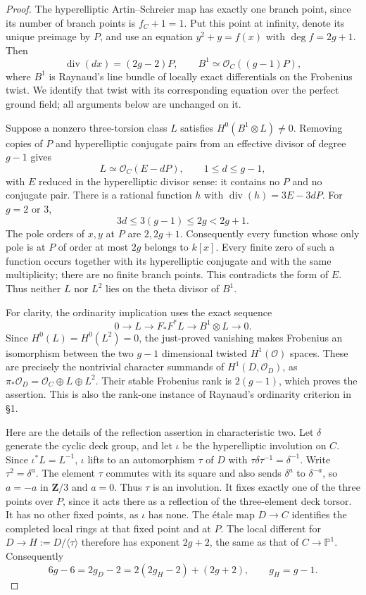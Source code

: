 \documentclass[11pt,a4paper]{article}
\newcommand{\Z}{\mathbf Z}
\begin{document}
\begin{proof}
The hyperelliptic Artin--Schreier map has exactly one
branch point, since its number of branch points is
$f_C+1=1$. Put this point at infinity, denote its
unique preimage by $P$, and use an equation
$y^2+y=f(x)$ with $\deg f=2g+1$. Then
\[
 \operatorname{div}(dx)=(2g-2)P,
 \qquad B^1\simeq\mathcal O_C((g-1)P),
\]
where $B^1$ is Raynaud's line bundle of locally exact
differentials on the Frobenius twist. We identify that
twist with its corresponding equation over the perfect
ground field; all arguments below are unchanged on it.

Suppose a nonzero three-torsion class $L$ satisfies
$H^0(B^1\otimes L)\ne0$. Removing copies of $P$ and
hyperelliptic conjugate pairs from an effective divisor
of degree $g-1$ gives
\[
 L\simeq\mathcal O_C(E-dP),\qquad 1\le d\le g-1,
\]
with $E$ reduced in the hyperelliptic divisor sense:
it contains no $P$ and no conjugate pair. There is a
rational function $h$ with
$\operatorname{div}(h)=3E-3dP$. For $g=2$ or $3$,
\[
 3d\le3(g-1)\le2g<2g+1.
\]
The pole orders of $x,y$ at $P$ are $2,2g+1$.
Consequently every function whose only pole is at
$P$ of order at most $2g$ belongs to $k[x]$.
Every finite zero of such a function occurs together
with its hyperelliptic conjugate and with the same
multiplicity; there are no finite branch points.
This contradicts the form of $E$. Thus neither $L$
nor $L^2$ lies on the theta divisor of $B^1$.

For clarity, the ordinarity implication uses the exact
sequence
\[
 0\longrightarrow L\longrightarrow F_*F^*L
   \longrightarrow B^1\otimes L\longrightarrow0.
\]
Since $H^0(L)=H^0(L^2)=0$, the just-proved vanishing
makes Frobenius an isomorphism between the two
$g-1$ dimensional twisted $H^1(\mathcal O)$ spaces.
These are precisely the nontrivial character summands
of $H^1(D,\mathcal O_D)$, as
$\pi_*\mathcal O_D=\mathcal O_C\oplus L\oplus L^2$.
Their stable Frobenius rank is $2(g-1)$, which proves
the assertion. This is also the rank-one instance of
Raynaud's ordinarity criterion in \S1.
\citep[\S1, before Proposition~1]{LA_Raynaud2000}

Here are the details of the reflection assertion in
characteristic two. Let $\delta$ generate the cyclic
deck group, and let $\iota$ be the hyperelliptic
involution on $C$. Since $\iota^*L=L^{-1}$,
$\iota$ lifts to an automorphism $\tau$ of $D$ with
$\tau\delta\tau^{-1}=\delta^{-1}$.
Write $\tau^2=\delta^a$. The element $\tau$ commutes
with its square and also sends $\delta^a$ to
$\delta^{-a}$, so $a=-a$ in $\Z/3$ and $a=0$.
Thus $\tau$ is an involution. It fixes exactly one
of the three points over $P$, since it acts there
as a reflection of the three-element deck torsor.
It has no other fixed points, as $\iota$ has none.
The \'etale map $D\to C$ identifies the completed
local rings at that fixed point and at $P$.
The local different for $D\to H:=D/\langle\tau\rangle$
therefore has exponent $2g+2$, the same as that of
$C\to\mathbb P^1$. Consequently
\[
 6g-6=2g_D-2=2(2g_H-2)+(2g+2),
 \qquad g_H=g-1.
\]


\end{proof}
\end{document}
